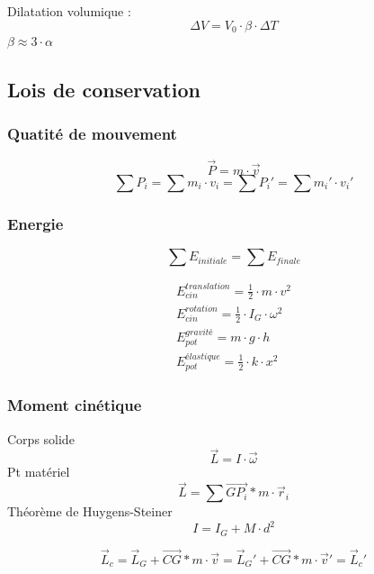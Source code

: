 \documentclass[12pt,a4paper,twoside]{article}
\numberwithin{equation}{subsection}
\begin{document}
Dilatation volumique : 
\begin{equation}
\Delta V=V_0 \cdot \beta \cdot \Delta T
\end{equation}
$\beta \approx 3\cdot \alpha$

\subsection{Lois de conservation}
\subsubsection{Quatité de mouvement}
\begin{equation}
\vec{P}=m \cdot \vec{v}
\end{equation}
\begin{equation}
\sum P_{i}=\sum m_i \cdot v_i= \sum P_i '=\sum m_i ' \cdot v_i '
\end{equation}
\subsubsection{Energie}
\begin{equation}
\sum E_{initiale}=\sum E_{finale}
\end{equation}

\begin{eqnarray}
E_{cin}^{translation}=\frac{1}{2} \cdot m \cdot v^2\\
E_{cin}^{rotation}=\frac{1}{2} \cdot I_G \cdot \omega^2\\
E_{pot}^{gravité}=m \cdot g \cdot h\\
E_{pot}^{élastique}=\frac{1}{2} \cdot k \cdot x^2
\end{eqnarray}

\subsubsection{Moment cinétique}
Corps solide
\begin{equation}
\vec{L}=I \cdot \vec{\omega}
\end{equation}
Pt matériel
\begin{equation}
\vec{L}=\sum \vec{GP_i}*m\cdot \vec{r}_i
\end{equation}
Théorème de Huygens-Steiner
\begin{equation}
I=I_G+M \cdot d^2
\end{equation}

\begin{equation}
\vec{L}_c=\vec{L}_G+ \vec{CG} * m \cdot \vec{v}=\vec{L}_G'+ \vec{CG} * m \cdot \vec{v}'=\vec{L}_c'
\end{equation}
\end{document}
